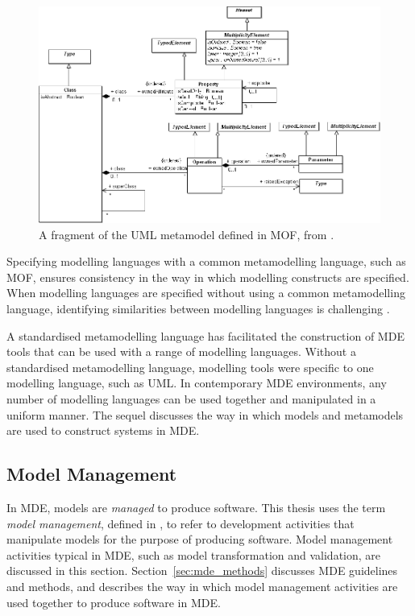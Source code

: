 \begin{figure}[htbp]
  \begin{center}
    \leavevmode
    \includegraphics[scale=0.33]{2.Background/images/mof.png}
  \end{center}
  \caption{A fragment of the UML metamodel defined in MOF, from \cite{uml212}.}
  \label{fig:mof}
\end{figure}

Specifying modelling languages with a common metamodelling language, such as MOF, ensures consistency in the way in which modelling constructs are specified. When modelling languages are specified without using a common metamodelling language, identifying similarities between modelling languages is challenging \cite[pg97]{frankel02mda}. 

A standardised metamodelling language has facilitated the construction of MDE tools that can be used with a range of modelling languages. Without a standardised metamodelling language, modelling tools were specific to one modelling language, such as UML. In contemporary MDE environments, any number of modelling languages can be used together and manipulated in a uniform manner. The sequel discusses the way in which models and metamodels are used to construct systems in MDE.

\subsection{Model Management}
\label{sec:mde}
In MDE, models are \emph{managed} to produce software. This thesis uses the term \emph{model management}, defined in \cite{kolovos09thesis}, to refer to development activities that manipulate models for the purpose of producing software. Model management activities typical in MDE, such as model transformation and validation, are discussed in this section. Section~\ref{sec:mde_methods} discusses MDE guidelines and methods, and describes the way in which model management activities are used together to produce software in MDE.

